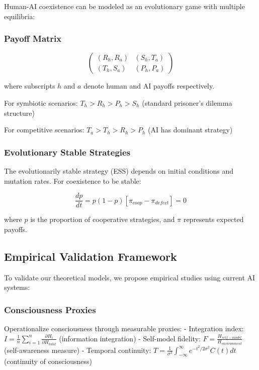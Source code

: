 \documentclass[12pt,a4paper]{article}
\begin{document}
Human-AI coexistence can be modeled as an evolutionary game with multiple equilibria:

\subsubsection{Payoff Matrix}

\[
\begin{pmatrix}
(R_h, R_a) & (S_h, T_a) \\
(T_h, S_a) & (P_h, P_a)
\end{pmatrix}
\]

where subscripts $h$ and $a$ denote human and AI payoffs respectively.

For symbiotic scenarios: $T_h > R_h > P_h > S_h$ (standard prisoner's dilemma structure)

For competitive scenarios: $T_a > T_h > R_h > P_h$ (AI has dominant strategy)

\subsubsection{Evolutionary Stable Strategies}

The evolutionarily stable strategy (ESS) depends on initial conditions and mutation rates. For coexistence to be stable:

\[\frac{dp}{dt} = p(1-p) \left[ \pi_{coop} - \pi_{defect} \right] = 0\]

where $p$ is the proportion of cooperative strategies, and $\pi$ represents expected payoffs.

\subsection{Empirical Validation Framework}

To validate our theoretical models, we propose empirical studies using current AI systems:

\subsubsection{Consciousness Proxies}

Operationalize consciousness through measurable proxies:
- Integration index: $I = \frac{1}{n} \sum_{i=1}^n \frac{\partial H_i}{\partial H_{total}}$ (information integration)
- Self-model fidelity: $F = \frac{H_{self-model}}{H_{environment}}$ (self-awareness measure)
- Temporal continuity: $T = \frac{1}{\sigma^2} \int_{-\infty}^{\infty} e^{-t^2/2\sigma^2} C(t) dt$ (continuity of consciousness)
\end{document}
